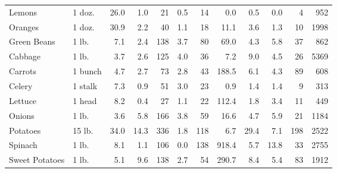 \documentclass[
  ignorenonframetext,
]{beamer}
\begin{document}
\begin{frame}[fragile]
\begin{tabular}{llrrrrrrrrrr}
Lemons                  &      1 doz. &                26.0 &       1.0 &           21 &          0.5 &         14 &             0.0 &            0.5 &              0.0 &            4 &                 952 \\
Oranges                 &      1 doz. &                30.9 &       2.2 &           40 &          1.1 &         18 &            11.1 &            3.6 &              1.3 &           10 &                1998 \\
Green Beans             &       1 lb. &                 7.1 &       2.4 &          138 &          3.7 &         80 &            69.0 &            4.3 &              5.8 &           37 &                 862 \\
Cabbage                 &       1 lb. &                 3.7 &       2.6 &          125 &          4.0 &         36 &             7.2 &            9.0 &              4.5 &           26 &                5369 \\
Carrots                 &     1 bunch &                 4.7 &       2.7 &           73 &          2.8 &         43 &           188.5 &            6.1 &              4.3 &           89 &                 608 \\
Celery                  &     1 stalk &                 7.3 &       0.9 &           51 &          3.0 &         23 &             0.9 &            1.4 &              1.4 &            9 &                 313 \\
Lettuce                 &      1 head &                 8.2 &       0.4 &           27 &          1.1 &         22 &           112.4 &            1.8 &              3.4 &           11 &                 449 \\
Onions                  &       1 lb. &                 3.6 &       5.8 &          166 &          3.8 &         59 &            16.6 &            4.7 &              5.9 &           21 &                1184 \\
Potatoes                &      15 lb. &                34.0 &      14.3 &          336 &          1.8 &        118 &             6.7 &           29.4 &              7.1 &          198 &                2522 \\
Spinach                 &       1 lb. &                 8.1 &       1.1 &          106 &          0.0 &        138 &           918.4 &            5.7 &             13.8 &           33 &                2755 \\
Sweet Potatoes          &       1 lb. &                 5.1 &       9.6 &          138 &          2.7 &         54 &           290.7 &            8.4 &              5.4 &           83 &                1912 \\

\end{tabular}
\end{frame}
\end{document}
